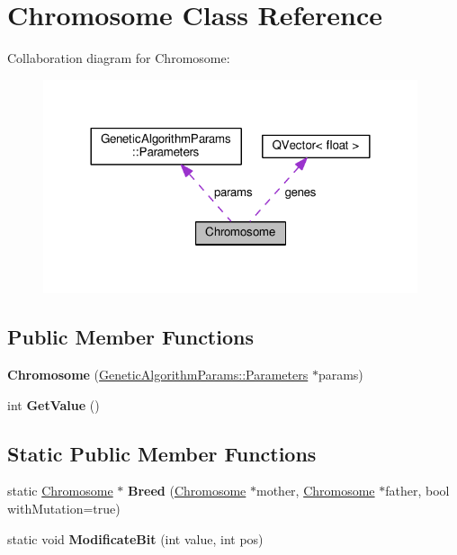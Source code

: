 \hypertarget{class_chromosome}{}\section{Chromosome Class Reference}
\label{class_chromosome}


Collaboration diagram for Chromosome\+:\nopagebreak
\begin{figure}[H]
\begin{center}
\leavevmode
\includegraphics[width=312pt]{class_chromosome__coll__graph}
\end{center}
\end{figure}
\subsection*{Public Member Functions}
\begin{DoxyCompactItemize}
\item 
{\bfseries Chromosome} (\hyperlink{struct_genetic_algorithm_params_1_1_parameters}{Genetic\+Algorithm\+Params\+::\+Parameters} $\ast$params)\hypertarget{class_chromosome_a61b3ad7248489642452df6c6c24bf580}{}\label{class_chromosome_a61b3ad7248489642452df6c6c24bf580}

\item 
int {\bfseries Get\+Value} ()\hypertarget{class_chromosome_a2df6c471bc3dd1b248f93f9bccc0e483}{}\label{class_chromosome_a2df6c471bc3dd1b248f93f9bccc0e483}

\end{DoxyCompactItemize}
\subsection*{Static Public Member Functions}
\begin{DoxyCompactItemize}
\item 
static \hyperlink{class_chromosome}{Chromosome} $\ast$ {\bfseries Breed} (\hyperlink{class_chromosome}{Chromosome} $\ast$mother, \hyperlink{class_chromosome}{Chromosome} $\ast$father, bool with\+Mutation=true)\hypertarget{class_chromosome_aaf9f158daad7690332a17158af82b9b3}{}\label{class_chromosome_aaf9f158daad7690332a17158af82b9b3}

\item 
static void {\bfseries Modificate\+Bit} (int value, int pos)\hypertarget{class_chromosome_a01362e7b1547ddef9e79ce2e94d46f85}{}\label{class_chromosome_a01362e7b1547ddef9e79ce2e94d46f85}

\end{DoxyCompactItemize}

